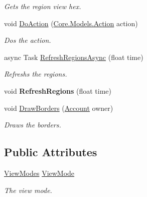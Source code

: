 \begin{DoxyCompactItemize}
\begin{DoxyCompactList}\small\item\em Gets the region view hex. \end{DoxyCompactList}\item 
void \hyperlink{classClient_1_1Common_1_1Views_1_1WorldLayerHex_a33f0ef24ab7dfdf7fb1fda840066698b}{Do\+Action} (\hyperlink{classCore_1_1Models_1_1Action}{Core.\+Models.\+Action} action)
\begin{DoxyCompactList}\small\item\em Dos the action. \end{DoxyCompactList}\item 
async Task \hyperlink{classClient_1_1Common_1_1Views_1_1WorldLayerHex_a70bd06aac88a6e2aaa6d9494da2a336f}{Refresh\+Regions\+Async} (float time)
\begin{DoxyCompactList}\small\item\em Refreshs the regions. \end{DoxyCompactList}\item 
\hypertarget{classClient_1_1Common_1_1Views_1_1WorldLayerHex_a2cd386d5c039cfdd83f204173d9947cf}{}void {\bfseries Refresh\+Regions} (float time)\label{classClient_1_1Common_1_1Views_1_1WorldLayerHex_a2cd386d5c039cfdd83f204173d9947cf}

\item 
void \hyperlink{classClient_1_1Common_1_1Views_1_1WorldLayerHex_a21fb54acaab2b9d573446cca8fc1f67d}{Draw\+Borders} (\hyperlink{classCore_1_1Models_1_1Account}{Account} owner)
\begin{DoxyCompactList}\small\item\em Draws the borders. \end{DoxyCompactList}\end{DoxyCompactItemize}
\subsection*{Public Attributes}
\begin{DoxyCompactItemize}
\item 
\hyperlink{classClient_1_1Common_1_1Views_1_1WorldLayerHex_a40891eae0c33b440c8038472a5f64eb8}{View\+Modes} \hyperlink{classClient_1_1Common_1_1Views_1_1WorldLayerHex_a03e940b1ad75c37ca44e714d700f0828}{View\+Mode}
\begin{DoxyCompactList}\small\item\em The view mode. \end{DoxyCompactList}\end{DoxyCompactItemize}
